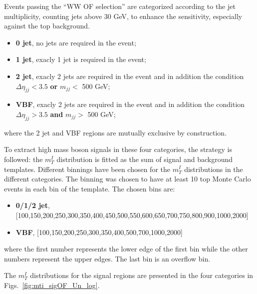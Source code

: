 Events passing the ``WW OF selection'' are categorized according to the jet
multiplicity, counting jets above 30 GeV, to enhance the sensitivity,
especially against the top background. 

\begin{itemize}
\item {\bf 0 jet}, no jets are required in the event;
\item {\bf 1 jet}, exacly 1 jet is required in the event;
\item {\bf 2 jet}, exacly 2 jets are required in the event and in addition the condition $\Delta \eta_{jj} < 3.5$ {\bf or} $m_{jj} <$ 500 GeV;
\item {\bf VBF}, exacly 2 jets are required in the event and in addition the condition $\Delta \eta_{jj} > 3.5$ {\bf and} $m_{jj} >$ 500 GeV;
\end{itemize}

where the 2 jet and VBF regions are mutually exclusive by construction.

To extract high mass boson signals in these four categories, the  strategy  is followed: the $m_T^I$ distribution is fitted as the sum of
signal and background templates. Different binnings have been chosen for the  $m_T^I$ distributions in the
different categories. The binning was chosen to have  at least 10
top Monte Carlo events in each bin of the template. The chosen bins are: 

\begin{itemize}
\item  {\bf 0/1/2 jet}, [100,150,200,250,300,350,400,450,500,550,600,650,700,750,800,900,1000,2000]
\item {\bf VBF}, [100,150,200,250,300,350,400,500,700,1000,2000]
\end{itemize}
where the first number represents the lower edge of the first bin while the other numbers represent the upper edges. The last bin is an overflow bin.

The  $m_T^I$ distributions for the signal regions are presented in the four categories in Figs.~\ref{fig:mti_sigOF_Un_log}.

